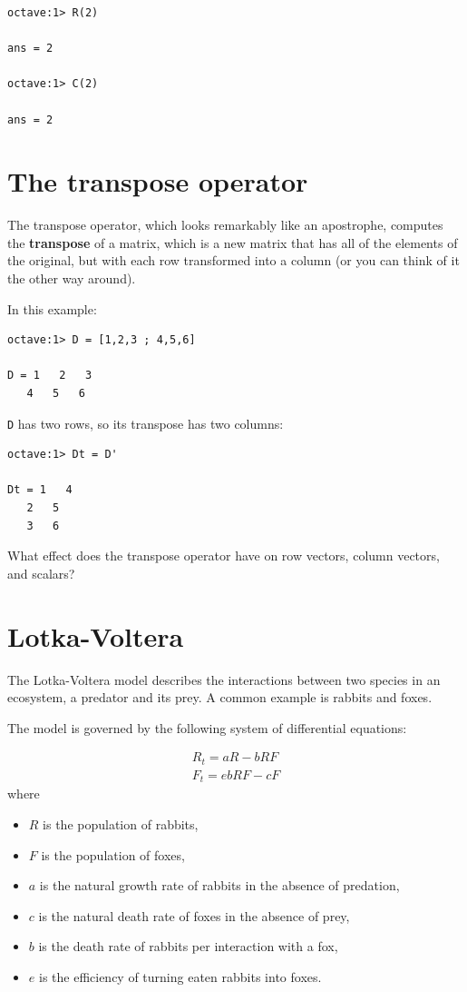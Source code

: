 \documentclass{book}
\begin{document}
\begin{verbatim}
octave:1> R(2)

ans = 2

octave:1> C(2)

ans = 2
\end{verbatim}



\section{The transpose operator}

The transpose operator, which looks remarkably like an apostrophe,
computes the {\bf transpose} of a matrix, which is a new matrix
that has all of the elements of the original, but with each row
transformed into a column (or you can think of it the other way around).

In this example:

\begin{verbatim}
octave:1> D = [1,2,3 ; 4,5,6]

D = 1   2   3
   4   5   6
\end{verbatim}

{\tt D} has two rows, so its transpose has two columns:

\begin{verbatim}
octave:1> Dt = D'

Dt = 1   4
   2   5
   3   6
\end{verbatim}

\begin{ex}
What effect does the transpose operator
have on row vectors, column vectors, and scalars?
\end{ex}


\section{Lotka-Voltera}
\label{lotka}

The Lotka-Voltera model describes the interactions between two
species in an ecosystem, a predator and its prey. A common example
is rabbits and foxes.

The model is governed by the following system of differential
equations:

\begin{eqnarray*}
R_t = a R - b R F \\
F_t = e b R F - c F
\end{eqnarray*}
%
where
%
\begin{itemize}
%
\item $R$ is the population of rabbits,
\item $F$ is the population of foxes,
\item $a$ is the natural growth rate of rabbits in the absence of predation,
\item $c$ is the natural death rate of foxes in the absence of prey,
\item $b$ is the death rate of rabbits per interaction with a fox,
\item $e$ is the efficiency of turning eaten rabbits into foxes.
%
\end{itemize}
\end{document}
